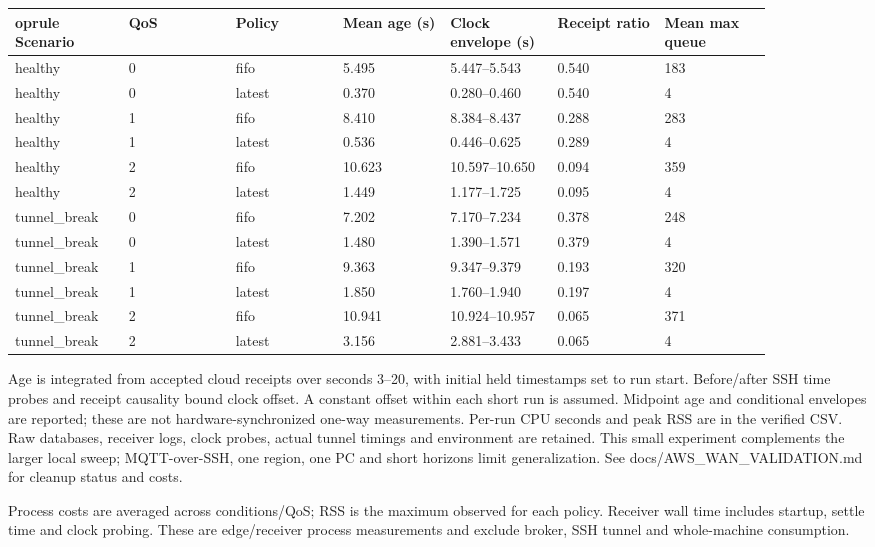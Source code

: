 \documentclass[11pt,a4paper]{article}
\begin{document}
\begingroup\small\setlength{\tabcolsep}{3pt}\begin{longtable}{p{0.12571428571428572\linewidth}p{0.12571428571428572\linewidth}p{0.12571428571428572\linewidth}p{0.12571428571428572\linewidth}p{0.12571428571428572\linewidth}p{0.12571428571428572\linewidth}p{0.12571428571428572\linewidth}}	oprule
Scenario & QoS & Policy & Mean age (s) & Clock envelope (s) & Receipt ratio & Mean max queue \\
\midrule\endhead
healthy & 0 & fifo & 5.495 & 5.447--5.543 & 0.540 & 183 \\
healthy & 0 & latest & 0.370 & 0.280--0.460 & 0.540 & 4 \\
healthy & 1 & fifo & 8.410 & 8.384--8.437 & 0.288 & 283 \\
healthy & 1 & latest & 0.536 & 0.446--0.625 & 0.289 & 4 \\
healthy & 2 & fifo & 10.623 & 10.597--10.650 & 0.094 & 359 \\
healthy & 2 & latest & 1.449 & 1.177--1.725 & 0.095 & 4 \\
tunnel\_break & 0 & fifo & 7.202 & 7.170--7.234 & 0.378 & 248 \\
tunnel\_break & 0 & latest & 1.480 & 1.390--1.571 & 0.379 & 4 \\
tunnel\_break & 1 & fifo & 9.363 & 9.347--9.379 & 0.193 & 320 \\
tunnel\_break & 1 & latest & 1.850 & 1.760--1.940 & 0.197 & 4 \\
tunnel\_break & 2 & fifo & 10.941 & 10.924--10.957 & 0.065 & 371 \\
tunnel\_break & 2 & latest & 3.156 & 2.881--3.433 & 0.065 & 4 \\
\bottomrule\end{longtable}\endgroup

Age is integrated from accepted cloud receipts over seconds 3--20, with initial held timestamps set to run start. Before/after SSH time probes and receipt causality bound clock offset. A constant offset within each short run is assumed. Midpoint age and conditional envelopes are reported; these are not hardware-synchronized one-way measurements. Per-run CPU seconds and peak RSS are in the verified CSV. Raw databases, receiver logs, clock probes, actual tunnel timings and environment are retained. This small experiment complements the larger local sweep; MQTT-over-SSH, one region, one PC and short horizons limit generalization. See docs/AWS\_WAN\_VALIDATION.md for cleanup status and costs.


Process costs are averaged across conditions/QoS; RSS is the maximum observed for each policy. Receiver wall time includes startup, settle time and clock probing. These are edge/receiver process measurements and exclude broker, SSH tunnel and whole-machine consumption.
\end{document}
